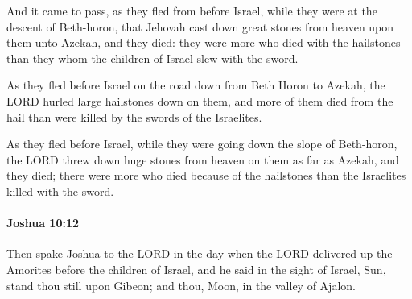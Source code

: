 			\begin{versebox}
					\item[BHS] 
					\item[ASV] And it came to pass, as they fled from before Israel, while they were at the descent of Beth-horon, that Jehovah cast down great stones from heaven upon them unto Azekah, and they died: they were more who died with the hailstones than they whom the children of Israel slew with the sword.
					\item[NIV] As they fled before Israel on the road down from Beth Horon to Azekah, the LORD hurled large hailstones down on them, and more of them died from the hail than were killed by the swords of the Israelites.
					\item[NRSV] As they fled before Israel, while they were going down the slope of Beth-horon, the LORD threw down huge stones from heaven on them as far as Azekah, and they died; there were more who died because of the hailstones than the Israelites killed with the sword.
			\end{versebox}

		\paragraph{Joshua 10:12} %
			\label{JOSHUA-10-12}

			Then spake Joshua to the LORD in the day when the LORD delivered up the Amorites before the children of Israel, and he said in the sight of Israel, Sun, stand thou still upon Gibeon; and thou, Moon, in the valley of Ajalon.

